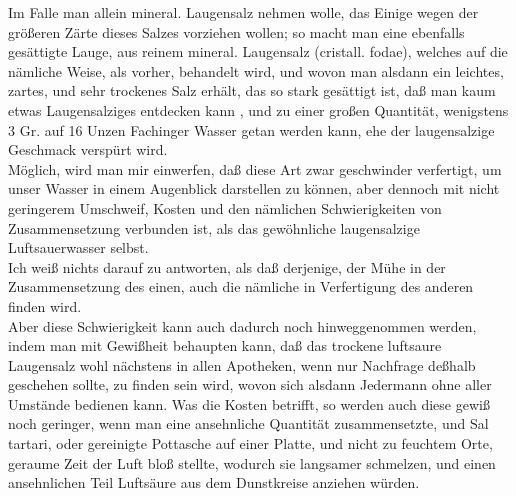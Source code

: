 \documentclass[11pt,a5paper,twoside]{memoir}
\begin{document}
Im Falle man allein mineral. Laugensalz nehmen wolle,
das Einige wegen der größeren Zärte dieses Salzes vorziehen wollen;
so macht man eine ebenfalls gesättigte Lauge,
aus reinem mineral. Laugensalz ({\lattext cristall. fodae}),
welches auf die nämliche Weise, als vorher, behandelt wird,
und wovon man alsdann ein leichtes, zartes,
und sehr trockenes Salz erhält, das so stark gesättigt ist,
daß man kaum etwas Laugensalziges entdecken kann%
,
und zu einer großen Quantität,
wenigstens 3 Gr. auf 16 Unzen Fachinger Wasser getan werden kann,
ehe der laugensalzige Geschmack verspürt wird.\\

Möglich, wird man mir einwerfen,
daß diese Art zwar geschwinder verfertigt,
um unser Wasser in einem Augenblick darstellen zu können,
aber dennoch mit nicht geringerem Umschweif,
Kosten und den nämlichen Schwierigkeiten von Zusammensetzung verbunden ist,
als das gewöhnliche laugensalzige Luftsauerwasser selbst.\\

Ich weiß nichts darauf zu antworten,
als daß derjenige, der Mühe in der Zusammensetzung des einen,
auch die nämliche in Verfertigung des anderen finden wird.\\

Aber diese Schwierigkeit kann auch dadurch noch hinweggenommen werden,
indem man mit Gewißheit behaupten kann,
daß das trockene luftsaure Laugensalz wohl nächstens in allen Apotheken,
wenn nur Nachfrage deßhalb geschehen sollte,
zu finden sein wird,
wovon sich alsdann Jedermann ohne aller Umstände bedienen kann.
Was die Kosten betrifft,
so werden auch diese gewiß noch geringer,
wenn man eine ansehnliche Quantität zusammensetzte,%
und {\lattext Sal tartari},
\label{whitewashing}
oder gereinigte Pottasche auf einer Platte,
und nicht zu feuchtem Orte,
geraume Zeit der Luft bloß stellte,
wodurch sie langsamer schmelzen,
und einen ansehnlichen Teil Luftsäure aus dem Dunstkreise anziehen würden.
\end{document}
